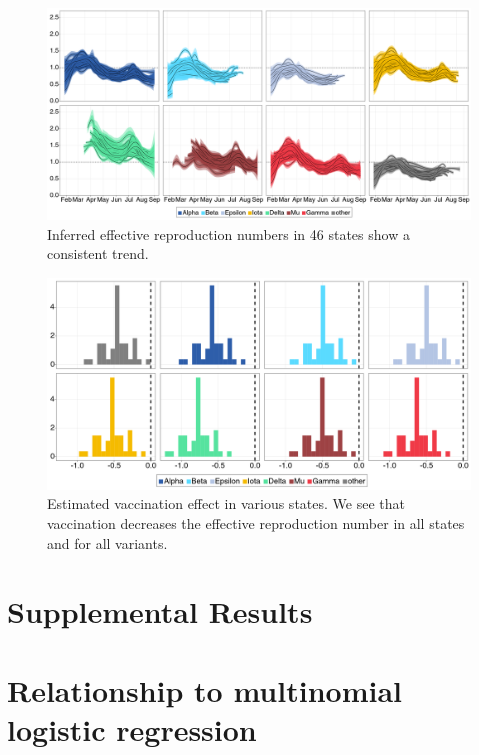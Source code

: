 \documentclass[12pt]{article}
\begin{document}
\begin{figure}
  \centering
  \includegraphics[width=\linewidth]{figs/fig_4_rt_consensus.png}
  \caption{Inferred effective reproduction numbers in 46 states show a consistent trend.}%
  \label{fig:4}
\end{figure}

\begin{figure}
  \centering
  \includegraphics[width=\linewidth]{figs/fig_5_vaccination_effect.png}
  \caption{Estimated vaccination effect in various states.
  We see that vaccination decreases the effective reproduction number in all states and for all variants.}%
  \label{fig:5}
\end{figure}




\newpage
\appendix

\section*{Supplemental Results}

\section{Relationship to multinomial logistic regression}
\end{document}
